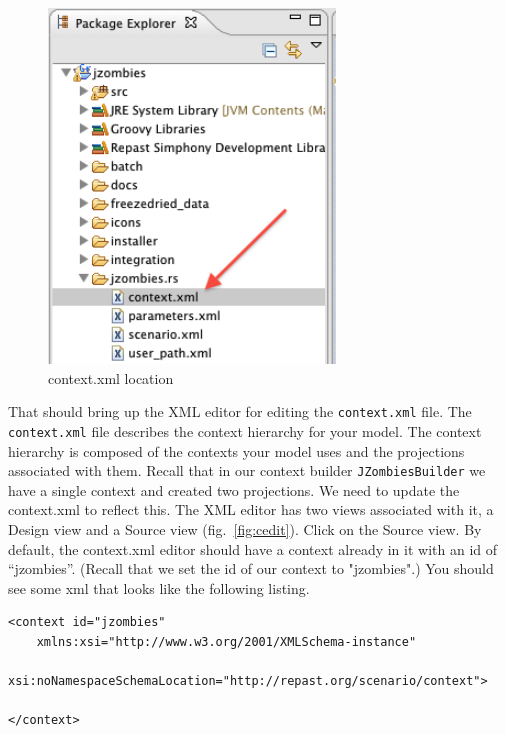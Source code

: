 \documentclass[11pt]{amsart}
\begin{document}
\begin{figure}[h]
\begin{center}
\vspace{.2in}
\centerline {
\includegraphics[width=3in]{GettingStartedImages/context_xml.png}
}
\caption{context.xml location}
\label{fig:context}
\end{center}
\end{figure}

That should bring up the XML editor for editing the \texttt{context.xml} file. The \texttt{context.xml} file describes the context hierarchy for your model. The context hierarchy is composed of the contexts your model uses and the projections associated with them. Recall that in our context builder \texttt{JZombiesBuilder} we have a single context and created two projections. We need to update the context.xml to reflect this. The XML editor has two views associated with it, a Design view and a Source view (fig.~\ref{fig:cedit}). Click on the Source view. By default, the context.xml editor should have a context already in it with an id of ``jzombies''. (Recall that we set the id of our context to "jzombies".) You should see some xml that looks like the following listing.

\noindent\begin{minipage}[h]{\textwidth}
\vspace{.2in}
\lstset{language=java,caption=context.xml 1}
\begin{lstlisting}
<context id="jzombies"
	xmlns:xsi="http://www.w3.org/2001/XMLSchema-instance"
	xsi:noNamespaceSchemaLocation="http://repast.org/scenario/context">
	
</context>

\end{lstlisting}
\vspace{.2in}
\end{minipage}
\end{document}
